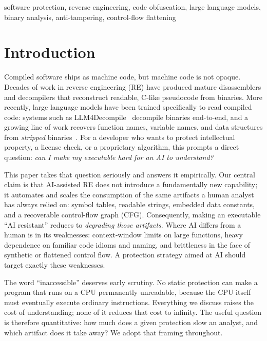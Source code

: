\documentclass[conference]{IEEEtran}
\begin{document}
\begin{IEEEkeywords}
software protection, reverse engineering, code obfuscation, large language
models, binary analysis, anti-tampering, control-flow flattening
\end{IEEEkeywords}

\section{Introduction}
Compiled software ships as machine code, but machine code is not opaque. Decades
of work in reverse engineering (RE) have produced mature disassemblers and
decompilers that reconstruct readable, C-like pseudocode from binaries. More
recently, large language models have been trained specifically to read compiled
code: systems such as LLM4Decompile~\cite{llm4decompile} decompile binaries
end-to-end, and a growing line of work recovers function names, variable names,
and data structures from \emph{stripped} binaries~\cite{resym,gennm,funcname,howfar}.
For a developer who wants to protect intellectual property, a license check, or
a proprietary algorithm, this prompts a direct question: \emph{can I make my
executable hard for an AI to understand?}

This paper takes that question seriously and answers it empirically. Our central
claim is that AI-assisted RE does not introduce a fundamentally new capability;
it automates and scales the consumption of the same artifacts a human analyst
has always relied on: symbol tables, readable strings, embedded data constants,
and a recoverable control-flow graph (CFG). Consequently, making an executable
``AI resistant'' reduces to \emph{degrading those artifacts}. Where AI differs
from a human is in its weaknesses: context-window limits on large functions,
heavy dependence on familiar code idioms and naming, and brittleness in the face
of synthetic or flattened control flow. A protection strategy aimed at AI should
target exactly these weaknesses.

The word ``inaccessible'' deserves early scrutiny. No static protection can make
a program that runs on a CPU permanently unreadable, because the CPU itself must
eventually execute ordinary instructions. Everything we discuss raises the cost
of understanding; none of it reduces that cost to infinity. The useful question
is therefore quantitative: how much does a given protection slow an analyst, and
which artifact does it take away? We adopt that framing throughout.
\end{document}
